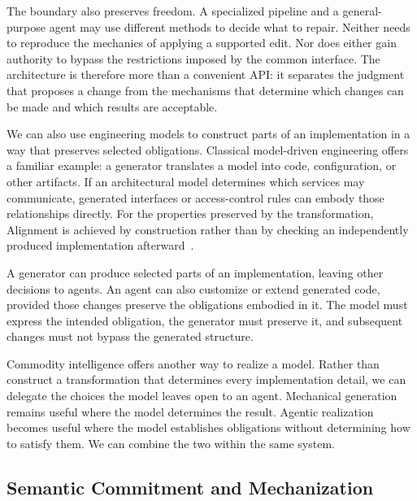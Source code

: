 The boundary also preserves freedom. A specialized pipeline and a general-purpose agent may use different methods to decide what to repair. Neither needs to reproduce the mechanics of applying a supported edit. Nor does either gain authority to bypass the restrictions imposed by the common interface. The architecture is therefore more than a convenient API: it separates the judgment that proposes a change from the mechanisms that determine which changes can be made and which results are acceptable.


We can also use engineering models to construct parts of an implementation in a way that preserves selected obligations. Classical model-driven engineering offers a familiar example: a generator translates a model into code, configuration, or other artifacts. If an architectural model determines which services may communicate, generated interfaces or access-control rules can embody those relationships directly. For the properties preserved by the transformation, Alignment is achieved by construction rather than by checking an independently produced implementation afterward~\citep{schmidt2006model,sendall2003model,czarnecki2006feature}.

A generator can produce selected parts of an implementation, leaving other decisions to agents. An agent can also customize or extend generated code, provided those changes preserve the obligations embodied in it. The model must express the intended obligation, the generator must preserve it, and subsequent changes must not bypass the generated structure.

Commodity intelligence offers another way to realize a model. Rather than construct a transformation that determines every implementation detail, we can delegate the choices the model leaves open to an agent. Mechanical generation remains useful where the model determines the result. Agentic realization becomes useful where the model establishes obligations without determining how to satisfy them. We can combine the two within the same system.

\subsection{Semantic Commitment and Mechanization}\label{heading:semantic-commitment-and-mechanization}


